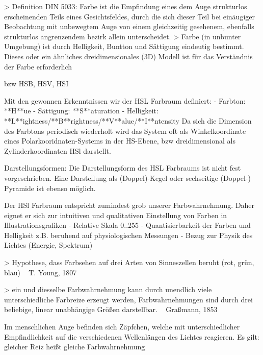 \documentclass[10pt,landscape]{article}
\makeatletter
\renewcommand{\subsection}{\@startsection{subsection}{2}{0mm}%
                                {-1explus -.5ex minus -.2ex}%
                                {0.5ex plus .2ex}%
                                {\normalfont\normalsize\bfseries}}
\makeatother
\begin{document}
\begin{multicols}{3}
> Definition DIN 5033: Farbe ist die Empfindung eines dem Auge strukturlos erscheinenden Teils eines Gesichtsfeldes, durch die sich dieser Teil bei einäugiger Beobachtung mit unbewegtem Auge von einem gleichzeitig gesehenem, ebenfalls strukturlos angrenzendem bezirk allein unterscheidet.
> Farbe (in unbunter Umgebung) ist durch Helligkeit, Buntton und Sättigung eindeutig bestimmt. Dieses oder ein ähnliches dreidimensionales (3D) Modell ist für das Verständnis der Farbe erforderlich


bzw HSB, HSV, HSI

Mit den gewonnen Erkenntnissen wir der HSL Farbraum definiert:
- Farbton: **H**ue
- Sättigung: **S**aturation
- Helligkeit: **L**ightness/**B**rightness/**V**alue/**I**ntensity
Da sich die Dimension des Farbtons periodisch wiederholt wird das System oft als Winkelkoordinate eines Polarkooridnaten-Systems in der HS-Ebene, bzw dreidimensional als Zylinderkoordinaten HSl darstellt.

Darstellungsformen: Die Darstellungsform des HSL Farbraums ist nicht fest vorgeschrieben. Eine Darstellung als (Doppel)-Kegel oder sechseitige (Doppel-) Pyramide ist ebenso möglich.

Der HSl Farbraum entspricht zumindest grob unserer Farbwahrnehmung. Daher eignet er sich zur intuitiven und qualitativen Einstellung von Farben in Illustrationsgrafiken
- Relative Skala 0..255
- Quantisierbarkeit der Farben und Helligkeit z.B. beruhend auf physiologischen Messungen
- Bezug zur Physik des Lichtes (Energie, Spektrum)

> Hypothese, dass Farbsehen auf drei Arten von Sinneszellen beruht (rot, grün, blau) ~ T. Young, 1807

> ein und diesselbe Farbwahrnehmung kann durch unendlich viele unterschiedliche Farbreize erzeugt werden, Farbwahrnehmungen sind durch drei beliebige, linear unabhängige Größen darstellbar. ~ Graßmann, 1853

Im menschlichen Auge befinden sich Zäpfchen, welche mit unterschiedlicher Empfindlichkeit auf die verschiedenen Wellenlängen des Lichtes reagieren. Es gilt: gleicher Reiz heißt gleiche Farbwahrnehmung


\end{multicols}
\end{document}
